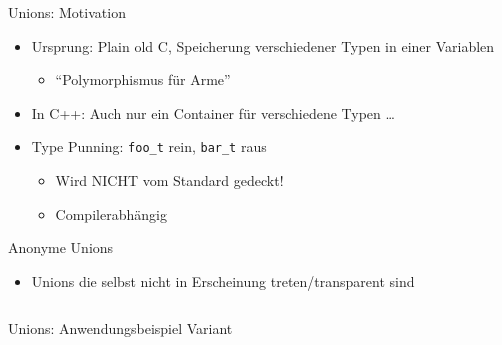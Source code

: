 \begin{frame}[fragile]{Unions: Motivation}
	\begin{itemize}
		\item Ursprung: Plain old C, Speicherung verschiedener Typen in einer Variablen
		\begin{itemize}
			\item \enquote{Polymorphismus für Arme}
		\end{itemize}
		\pause
		\item In C++: Auch nur ein Container für verschiedene Typen \dots
		\pause
		\item Type Punning: \verb|foo_t| rein, \verb|bar_t| raus
		\begin{itemize}
			\item Wird NICHT vom Standard gedeckt!
			\item Compilerabhängig
		\end{itemize}
	\end{itemize}
\end{frame}

\begin{frame}[fragile]{Anonyme Unions}
	\begin{itemize}
		\item Unions die selbst nicht in Erscheinung treten/transparent sind
	\end{itemize}
	
	\footnotesize
	
	\begin{columns}[t]
			
			
			
	\end{columns}
\end{frame}

\begin{frame}[fragile]{Unions: Anwendungsbeispiel Variant}
	
\end{frame}

